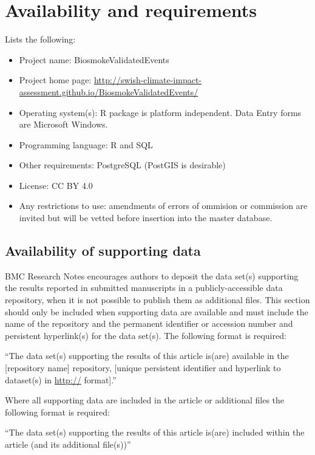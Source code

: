 \section{Availability and
requirements}\label{availability-and-requirements}

Lists the following:

\begin{itemize}
\itemsep1pt\parskip0pt
\item
  Project name: BiosmokeValidatedEvents
\item
  Project home page:
  \url{http://swish-climate-impact-assessment.github.io/BiosmokeValidatedEvents/}
\item
  Operating system(s): R package is platform independent. Data Entry
  forms are Microsoft Windows.
\item
  Programming language: R and SQL
\item
  Other requirements: PostgreSQL (PostGIS is desirable)
\item
  License: CC BY 4.0
\item
  Any restrictions to use: amendments of errors of ommision or
  commission are invited but will be vetted before insertion into the
  master database.
\end{itemize}

\subsection{Availability of supporting
data}\label{availability-of-supporting-data}

BMC Research Notes encourages authors to deposit the data set(s)
supporting the results reported in submitted manuscripts in a
publicly-accessible data repository, when it is not possible to publish
them as additional files. This section should only be included when
supporting data are available and must include the name of the
repository and the permanent identifier or accession number and
persistent hyperlink(s) for the data set(s). The following format is
required:

``The data set(s) supporting the results of this article is(are)
available in the {[}repository name{]} repository, {[}unique persistent
identifier and hyperlink to dataset(s) in \url{http://} format{]}.''

Where all supporting data are included in the article or additional
files the following format is required:

``The data set(s) supporting the results of this article is(are)
included within the article (and its additional file(s))''

